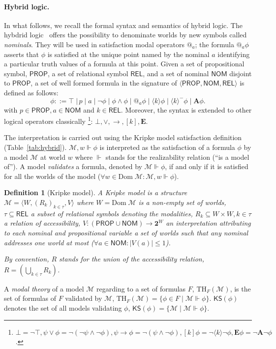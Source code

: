 \documentclass{eptcs}
\newcommand{\tuple}[1]{{\langle #1 \rangle}}
\newtheorem{definition}{Definition}
\newcommand{\ie}[0]{\abbrev{\textit{i.e.}}}
\newcommand{\A}[1]{[{#1}]}
\newcommand{\E}[1]{\langle{#1}\rangle}
\newcommand{\dom}[1]{\text{Dom} \; #1} \newcommand{\cause}[0]{\mathrel{\medcircle\kern-3.25pt \to}} \newcommand{\pcause}[0]{\mathrel{\odot\kern-3.25pt \to}} \newcommand{\remcause}[0]{\mathrel{\oplus\kern-3.25pt \to}} \newcommand{\allcause}[0]{\mathrel{\ostar\kern-3.25pt \to}} \newcommand{\reg}[0]{\longrightarrow}
\newcounter{ti}
\begin{document}
\paragraph{Hybrid logic.} In what follows, we recall the formal syntax and semantics of hybrid logic.
 The hybdrid logic~\cite{Blackburn2006,Brauner2010} offers the possibility to denominate worlds by new symbols called \textit{nominals}. They will be used in satisfaction modal operators $@_a$; the formula $@_a\phi$ asserts that $\phi$ is satisfied at the unique point named by the nominal $a$ identifying a particular truth values of a formula at this point. 
Given a set of propositional symbol, $\textsf{PROP}$, a set of relational symbol $\textsf{REL}$, and a set of nominal $\textsf{NOM}$ disjoint to 
 $\textsf{PROP}$, a set of well formed formula in the signature of $\tuple{\textsf{PROP}, \textsf{NOM}, \textsf{REL}}$ is defined as follows:
$$ \phi ::= \top \;|\, p \;|\; a \;|\; \neg \phi \;|\; \phi \land \phi \;|\; @_a \phi \;|\; \E{k} \phi \;|\; \E{k}^- \phi \;|\;\textbf{A} \phi.$$ 
with $p \in \textsf{PROP}, a \in \textsf{NOM}$ and $k \in \textsf{REL}$.
 Moreover, the syntax is extended to other logical operators classically \footnote{ $\bot = \neg \top, \psi \lor \phi = \neg (\neg \psi \land \neg \phi), \psi \to \phi = \neg ( \psi \land \neg \phi), \A{k} \phi = \neg \E{k} \neg \phi, \textbf{E} \phi = \neg \textbf{A} \neg \phi$.}:
 $\bot, \lor, \to, \A{k}, \textbf{E}$. 


The interpretation is carried out using the Kripke model satisfaction definition (Table~\ref{tab:hybrid}).
$\mathcal M,w \Vdash \phi$ is interpreted as the satisfaction of a formula $\phi$ by a model $\mathcal M$ at world $w$ where $\Vdash$ stands for the realizability relation (\ie ``is a model of''). A model \emph{validates} a formula, denoted by $ \mathcal M \Vdash \phi$, if and only if it is satisfied for all the worlds of the model (\ie $\forall w \in \dom \mathcal M: \mathcal M,w \Vdash \phi$).
\begin{definition}[Kripke model]
\label{def:kripke}
A Kripke model is a structure $\mathcal M = \tuple{W, (R_k)_{k \in \tau}, V} $ where $W = \dom{\mathcal M}$ is a non-empty set of \emph{worlds}, $\tau \subseteq \textsf{REL} $ a subset of relational symbols denoting the \emph{modalities}, $R_k \subseteq W \times W, k \in \tau$ a relation of accessibility, $V:(\textsf{PROP} \cup \textsf{NOM}) \to \textbf{2}^W$ an interpretation attributing to each nominal and propositional variable a set of worlds such that any nominal addresses one world at most (\ie $\forall a \in \textsf{NOM}: |V(a)| \leq 1$).

\medskip
\noindent
By convention, $R$ stands for the union of the accessibility relation, $R=(\bigcup_{k \in \tau} R_k)$.
\end{definition}
A \emph{modal theory} of a model $\mathcal M$ regarding to a set of formulas $F$, $\text{TH}_F (\mathcal M)$, is the set of formulas of $F$ validated by $\mathcal M$, \ie $\text{TH}_F (\mathcal M)=\{ \phi \in F \mid \mathcal M \Vdash \phi \}$. 
$\textsf{KS}(\phi)$ denotes the set of all models validating $\phi$, \ie $\textsf{KS}(\phi) = \{ \mathcal M \mid \mathcal M \Vdash \phi \}$.
\end{document}
